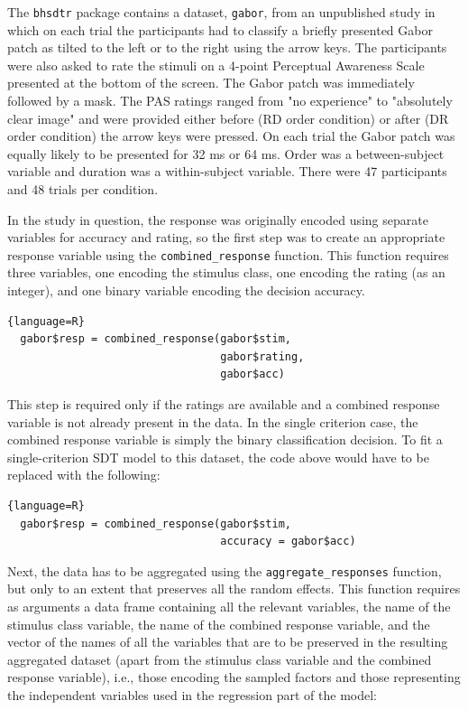 \documentclass[a4paper,man,apacite,floatsintext]{apa6}
\newcommand{\code}[1]{\texttt{#1}}
\begin{document}
The \code{bhsdtr} package contains a dataset, \code{gabor}, from an
unpublished study in which on each trial the participants had to
classify a briefly presented Gabor patch as tilted to the left or to
the right using the arrow keys. The participants were also asked to
rate the stimuli on a 4-point Perceptual Awareness Scale
\cite{ramsoy2004introspection} presented at the bottom of the
screen. The Gabor patch was immediately followed by a mask. The PAS
ratings ranged from "no experience" to "absolutely clear image" and
were provided either before (RD order condition) or after (DR order
condition) the arrow keys were pressed. On each trial the Gabor patch
was equally likely to be presented for 32 ms or 64 ms. Order was a
between-subject variable and duration was a within-subject
variable. There were 47 participants and 48 trials per condition.

In the study in question, the response was originally encoded using
separate variables for accuracy and rating, so the first step was to
create an appropriate response variable using the
\code{combined\_response} function. This function requires three
variables, one encoding the stimulus class, one encoding the rating
(as an integer), and one binary variable encoding the decision
accuracy.

\begin{lstlisting}{language=R}
  gabor$resp = combined_response(gabor$stim, 
                                 gabor$rating, 
                                 gabor$acc)
\end{lstlisting}

This step is required only if the ratings are available and a combined
response variable is not already present in the data. In the single
criterion case, the combined response variable is simply the binary
classification decision. To fit a single-criterion SDT model to this
dataset, the code above would have to be replaced with the following:

\begin{lstlisting}{language=R}
  gabor$resp = combined_response(gabor$stim, 
                                 accuracy = gabor$acc)
\end{lstlisting}

Next, the data has to be aggregated using the
\code{aggregate\_responses} function, but only to an extent that
preserves all the random effects. This function requires as arguments
a data frame containing all the relevant variables, the name of the
stimulus class variable, the name of the combined response variable,
and the vector of the names of all the variables that are to be
preserved in the resulting aggregated dataset (apart from the stimulus
class variable and the combined response variable), i.e., those
encoding the sampled factors and those representing the independent
variables used in the regression part of the model:
\end{document}
